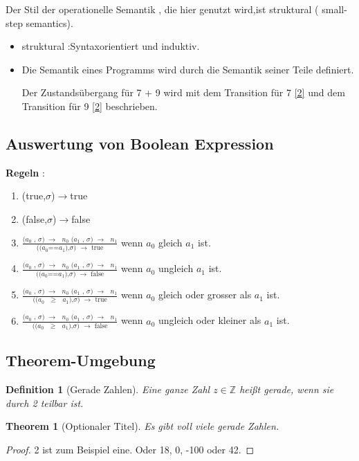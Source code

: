 \documentclass[a4paper,12pt,twoside,headsepline]{scrartcl}
\newtheorem{definition}{Definition}
\newtheorem{theorem}{Theorem}
\begin{document}
Der Stil der operationelle  Semantik , die hier genutzt wird,ist struktural ( small-step semantics).
\begin{itemize}
\item struktural :Syntaxorientiert und induktiv.
\item Die Semantik eines Programms wird durch  die Semantik seiner Teile definiert.


Der Zustandsübergang für 7 + 9 wird mit dem Transition für 7 \ref{2} und dem Transition für 9 \ref {2} beschrieben.
\end{itemize}
              
\subsection{Auswertung von Boolean Expression}       
 \textbf{Regeln} :
 \begin{enumerate}
 \item \label{11} (true,$\sigma$)$\to$true
	\item \label{12} (false,$\sigma$)$\to$false
	\item \label{13}  $\frac  {\text {($a_0$ , $\sigma$) $\to$ $n_0$   ($a_1$ , $\sigma$) $\to$ $n_1$} } { \text{(($a_0$==$a_1$),$\sigma$) $\to$ true} }$  
	wenn $a_0$ gleich $a_1$ ist.
	\item \label{14}  $\frac  {\text {($a_0$ , $\sigma$) $\to$ $n_0$   ($a_1$ , $\sigma$) $\to$ $n_1$} } { \text{(($a_0$==$a_1$),$\sigma$) $\to$ false} }$
	wenn $a_0$ ungleich $a_1$ ist.
	\item \label{15}  $\frac  {\text {($a_0$ , $\sigma$) $\to$ $n_0$   ($a_1$ , $\sigma$) $\to$ $n_1$} } { \text{(($a_0$ $\geq$ $a_1$),$\sigma$) $\to$ true} }$
	wenn $a_0$ gleich oder grosser als $a_1$ ist.
	\item \label{16}  $\frac  {\text {($a_0$ , $\sigma$) $\to$ $n_0$   ($a_1$ , $\sigma$) $\to$ $n_1$} } { \text{(($a_0$ $\geq$ $a_1$),$\sigma$) $\to$ false} }$
	wenn $a_0$ ungleich oder kleiner als $a_1$ ist.
\end{enumerate}          
                     
\subsection{Theorem-Umgebung}

\begin{definition}[Gerade Zahlen]
 Eine ganze Zahl $z \in \mathbb Z$ heißt \emph{gerade}, wenn sie durch 2 teilbar ist.
\end{definition}

\begin{theorem}[Optionaler Titel]
 Es gibt voll viele gerade Zahlen.
\end{theorem}
\begin{proof}
 2 ist zum Beispiel eine. Oder 18, 0, -100 oder 42.
\end{proof}





\end{document}
